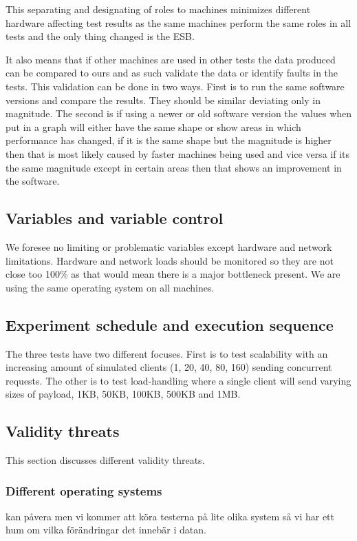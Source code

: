 
This separating and designating of roles to machines minimizes different hardware affecting test results as the same machines perform the same roles in all tests and the only thing changed is the ESB. 

It also means that if other machines are used in other tests the data produced can be compared to ours and as such validate the data or identify faults in the tests. This validation can be done in two ways. First is to run the same software versions and compare the results. They should be similar deviating only in magnitude. The second is if using a newer or old software version the values when put in a graph will either have the same shape or show areas in which performance has changed, if it is the same shape but the magnitude is higher then that is most likely caused by faster machines being used and vice versa if its the same magnitude except in certain areas then that shows an improvement in the software.

\subsection{Variables and variable control}
We foresee no limiting or problematic variables except hardware and network limitations.
Hardware and network loads should be monitored so they are not close too 100\% as that would mean there is a major bottleneck present. 
We are using the same operating system on all machines. 
\subsection{Experiment schedule and execution sequence}
The three tests have two different focuses. First is to test scalability with an increasing amount of simulated clients (1, 20, 40, 80, 160) sending concurrent requests. 
The other is to test load-handling where a single client will send varying sizes of payload, 1KB, 50KB, 100KB, 500KB and 1MB.
\subsection{Validity threats}
This section discusses different validity threats.
\subsubsection{Different operating systems}
kan påvera men vi kommer att köra testerna på lite olika system så vi har ett hum om vilka förändringar det innebär i datan.
